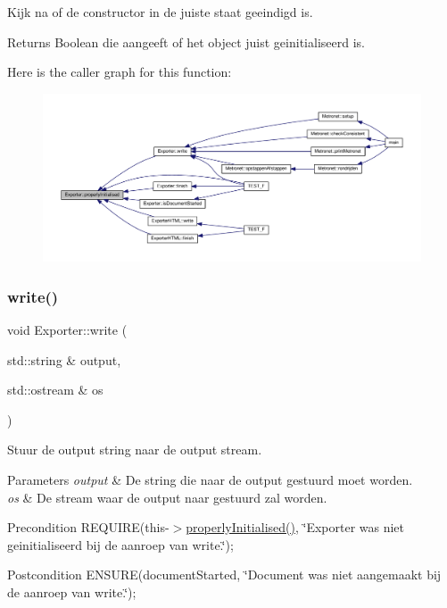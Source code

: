 Kijk na of de constructor in de juiste staat geeindigd is. 

\begin{DoxyReturn}{Returns}
Boolean die aangeeft of het object juist geinitialiseerd is. 
\end{DoxyReturn}
Here is the caller graph for this function\+:\nopagebreak
\begin{figure}[H]
\begin{center}
\leavevmode
\includegraphics[width=350pt]{class_exporter_aafd9df9210aeefd7bb7fd434fc317cf0_icgraph}
\end{center}
\end{figure}
\mbox{\label{class_exporter_ab3736803133eb727cf87a7306f91eb11}} 
\subsubsection{\texorpdfstring{write()}{write()}}
{\footnotesize\ttfamily void Exporter\+::write (\begin{DoxyParamCaption}\item[{std\+::string \&}]{output,  }\item[{std\+::ostream \&}]{os }\end{DoxyParamCaption})\hspace{0.3cm}{\ttfamily [virtual]}}



Stuur de output string naar de output stream. 


\begin{DoxyParams}{Parameters}
{\em output} & De string die naar de output gestuurd moet worden. \\
\hline
{\em os} & De stream waar de output naar gestuurd zal worden. \\
\hline
\end{DoxyParams}
\begin{DoxyPrecond}{Precondition}
R\+E\+Q\+U\+I\+RE(this-\/$>$\hyperlink{class_exporter_aafd9df9210aeefd7bb7fd434fc317cf0}{properly\+Initialised()}, \char`\"{}\+Exporter was niet geinitialiseerd bij de aanroep van write.\char`\"{}); 
\end{DoxyPrecond}
\begin{DoxyPostcond}{Postcondition}
E\+N\+S\+U\+RE(document\+Started, \char`\"{}\+Document was niet aangemaakt bij de aanroep van write.\char`\"{}); 
\end{DoxyPostcond}


